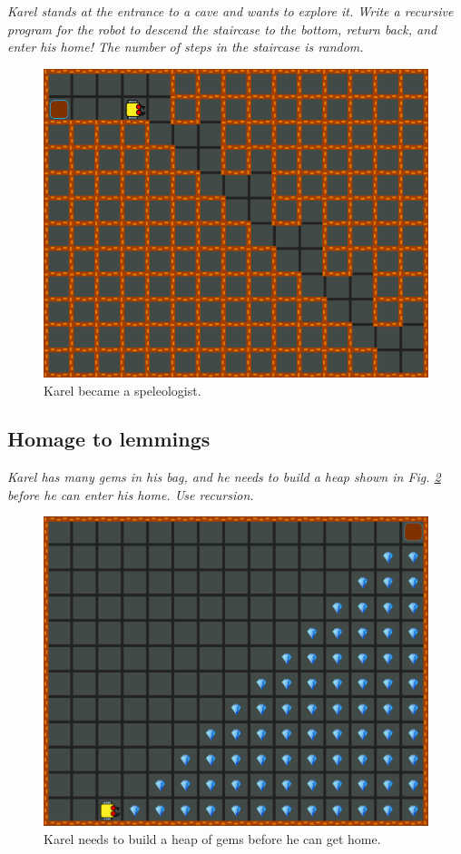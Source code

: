 {{{\em Karel stands at the entrance to a cave and wants to explore it. Write a recursive program for the robot to descend the staircase to the bottom, return back, and enter his home! The number of steps in the staircase is random.}
\begin{figure}[!ht]
\begin{center}
\includegraphics[height=0.4\textwidth]{img/g02.png}
\end{center}
\vspace{-4mm}
\caption{Karel became a speleologist.}
\label{fig:g02}
\end{figure}
\vspace{-1cm}



\subsection{Homage to lemmings}

{\em  Karel has many gems in his bag, and he needs to build a heap shown in Fig. \ref{fig:g03} before he can 
enter his home. Use recursion.}

\begin{figure}[!ht]
\begin{center}
\includegraphics[height=0.4\textwidth]{img/g03.png}
\end{center}
\vspace{-4mm}
\caption{Karel needs to build a heap of gems before he can get home.}
\label{fig:g03}
\vspace{-1cm}
\end{figure}
\newpage


}}
